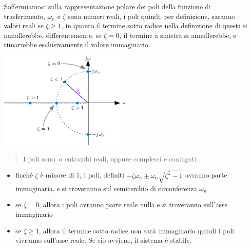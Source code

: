 \documentclass[10pt, letterpaper]{report}
\begin{document}
Soffermiamoci sulla rappresentazione polare dei poli della funzione di trasferimento, $\omega_n$ e 
$\zeta$ sono numeri reali, i poli quindi, per definizione, saranno valori 
reali se $\zeta\ge1$, in quanto il termine sotto radice nella definizione di questi si annullerebbe, 
differentemente, se $\zeta=0$, il termine a sinistra si annullerebbe, e rimarrebbe 
esclusivamente il valore immaginario.\begin{center}
    \includegraphics[width=0.5\textwidth ]{images/zetaomega.eps}
\end{center} \begin{quote}
    
    I poli sono, o entrambi reali, oppure complessi e coniugati.
\end{quote}
\begin{itemize}
    \item finché $\zeta$ è minore di 1, i poli, definiti $-\zeta\omega_n\pm\omega_n\sqrt{\zeta^2-1}$ avranno 
    parte immaginaria, e si troveranno sul semicerchio di circonferenza $\omega_n$ 
    \item se $\zeta=0$, allora i poli avranno parte reale nulla e si troveranno sull'asse immaginario
    \item se $\zeta\ge 1$, allora il termine sotto radice non sarà immaginario quindi i poli 
    vivranno sull'asse reale. Se ciò avviene, il sistema è stabile.
\end{itemize}
\end{document}
